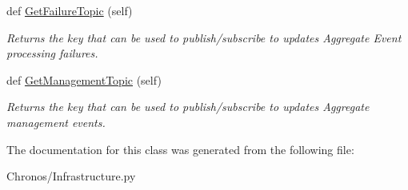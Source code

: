 \begin{DoxyCompactItemize}
def \hyperlink{group__Chronos_gab5dbc212a17aa66d7ec28621aef49f86}{Get\+Failure\+Topic} (self)
\begin{DoxyCompactList}\small\item\em Returns the key that can be used to publish/subscribe to updates Aggregate Event processing failures. \end{DoxyCompactList}\item 
def \hyperlink{group__Chronos_gafd61ad1c57013bfbec5d768f57088e18}{Get\+Management\+Topic} (self)
\begin{DoxyCompactList}\small\item\em Returns the key that can be used to publish/subscribe to updates Aggregate management events. \end{DoxyCompactList}\end{DoxyCompactItemize}


The documentation for this class was generated from the following file\+:\begin{DoxyCompactItemize}
\item 
Chronos/Infrastructure.\+py\end{DoxyCompactItemize}
